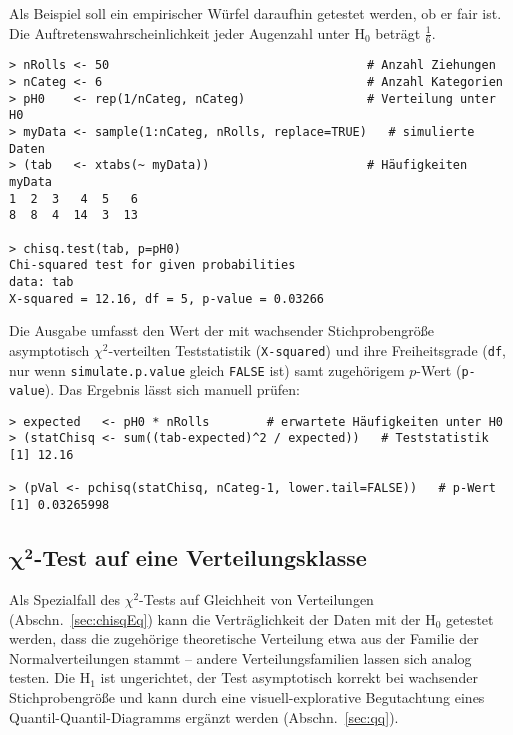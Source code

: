 Als Beispiel soll ein empirischer Würfel daraufhin getestet werden, ob er fair ist. Die Auftretenswahrscheinlichkeit jeder Augenzahl unter $\text{H}_{0}$ beträgt $\frac{1}{6}$.
\begin{lstlisting}
> nRolls <- 50                                    # Anzahl Ziehungen
> nCateg <- 6                                     # Anzahl Kategorien
> pH0    <- rep(1/nCateg, nCateg)                 # Verteilung unter H0
> myData <- sample(1:nCateg, nRolls, replace=TRUE)   # simulierte Daten
> (tab   <- xtabs(~ myData))                      # Häufigkeiten
myData
1  2  3   4  5   6
8  8  4  14  3  13

> chisq.test(tab, p=pH0)
Chi-squared test for given probabilities
data: tab
X-squared = 12.16, df = 5, p-value = 0.03266
\end{lstlisting}

Die Ausgabe umfasst den Wert der mit wachsender Stichprobengröße asymptotisch $\chi^{2}$-verteilten Teststatistik (\lstinline!X-squared!) und ihre Freiheitsgrade (\lstinline!df!, nur wenn \lstinline!simulate.p.value! gleich \lstinline!FALSE! ist) samt zugehörigem $p$-Wert (\lstinline!p-value!). Das Ergebnis lässt sich manuell prüfen:
\begin{lstlisting}
> expected   <- pH0 * nRolls        # erwartete Häufigkeiten unter H0
> (statChisq <- sum((tab-expected)^2 / expected))   # Teststatistik
[1] 12.16

> (pVal <- pchisq(statChisq, nCateg-1, lower.tail=FALSE))   # p-Wert
[1] 0.03265998
\end{lstlisting}

\subsection[\texorpdfstring{$\chi^{2}$}{chi2}-Test auf eine Verteilungsklasse]{$\bm{\chi^{2}}$-Test auf eine Verteilungsklasse}
\label{sec:chisqGof}

Als Spezialfall des $\chi^{2}$-Tests auf Gleichheit von Verteilungen (Abschn.\ \ref{sec:chisqEq}) kann die Verträglichkeit der Daten mit der $\text{H}_{0}$ getestet werden, dass die zugehörige theoretische Verteilung etwa aus der Familie der Normalverteilungen stammt -- andere Verteilungsfamilien lassen sich analog testen. Die $\text{H}_{1}$ ist ungerichtet, der Test asymptotisch korrekt bei wachsender Stichprobengröße und kann durch eine visuell-explorative Begutachtung eines Quantil-Quantil-Diagramms ergänzt werden (Abschn.\ \ref{sec:qq}).

